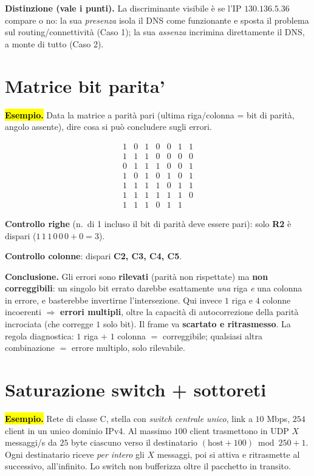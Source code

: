 \documentclass[11pt,a4paper]{report}
\begin{document}
\medskip
\textbf{Distinzione (vale i punti).} La discriminante visibile è se l'IP
$130.136.5.36$ compare o no: la sua \emph{presenza} isola il DNS come
funzionante e sposta il problema sul routing/connettività (Caso 1); la sua
\emph{assenza} incrimina direttamente il DNS, a monte di tutto (Caso 2).

\section{Matrice bit parita'}
\label{teoria:parmat}
\hl{\textbf{Esempio.}} Data la
matrice a parità pari (ultima riga/colonna = bit di parità, angolo assente),
dire cosa si può concludere sugli errori.

\[
\begin{array}{cccccc|c}
1 & 0 & 1 & 0 & 0 & 1 & 1 \\
1 & 1 & 1 & 0 & 0 & 0 & 0 \\
0 & 1 & 1 & 1 & 0 & 0 & 1 \\
1 & 0 & 1 & 0 & 1 & 0 & 1 \\
1 & 1 & 1 & 1 & 0 & 1 & 1 \\
1 & 1 & 1 & 1 & 1 & 1 & 0 \\ \hline
1 & 1 & 1 & 0 & 1 & 1 &
\end{array}
\]

\textbf{Controllo righe} (n.\ di 1 incluso il bit di parità deve essere pari):
solo \textbf{R2} è dispari ($1\,1\,1\,0\,0\,0 + 0 = 3$).

\textbf{Controllo colonne}: dispari \textbf{C2, C3, C4, C5}.

\textbf{Conclusione.} Gli errori sono \textbf{rilevati} (parità non rispettate)
ma \textbf{non correggibili}: un singolo bit errato darebbe esattamente
\emph{una} riga \emph{e} una colonna in errore, e basterebbe invertirne
l'intersezione. Qui invece $1$ riga e $4$ colonne incoerenti $\Rightarrow$
\textbf{errori multipli}, oltre la capacità di autocorrezione della parità
incrociata (che corregge $1$ solo bit). Il frame va \textbf{scartato e
ritrasmesso}. La regola diagnostica: $1$ riga $+$ $1$ colonna $=$ correggibile;
qualsiasi altra combinazione $=$ errore multiplo, solo rilevabile.

\section{Saturazione switch + sottoreti}
\label{teoria:satswitch}
\hl{\textbf{Esempio.}} Rete di classe C,
stella con \emph{switch centrale unico}, link a $10$ Mbps, $254$ client in un
unico dominio IPv4. Al massimo $100$ client trasmettono in UDP $X$ messaggi/s da
$25$ byte ciascuno verso il destinatario $(\text{host}+100)\bmod 250 +1$. Ogni
destinatario riceve \emph{per intero} gli $X$ messaggi, poi si attiva e ritrasmette
al successivo, all'infinito. Lo switch non bufferizza oltre il pacchetto in transito.
\end{document}
